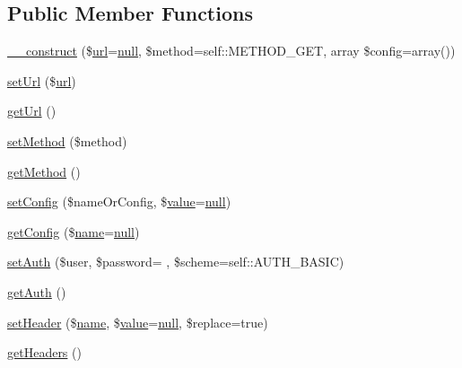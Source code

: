 \subsection*{Public Member Functions}
\begin{DoxyCompactItemize}
\item 
\hyperlink{classHTTP__Request2_a8dbfb11ace471827bd83792df59ded9f}{\+\_\+\+\_\+construct} (\$\hyperlink{swfupload_8js_a440a52a9004fdab0700100a6ddb49f67}{url}=\hyperlink{modernizr_8min_8js_a286f9ec831c5e676eeb493248eab9575}{null}, \$method=self\+::\+M\+E\+T\+H\+O\+D\+\_\+\+G\+ET, array \$config=array())
\item 
\hyperlink{classHTTP__Request2_a323cb019d1cb621ec9419941d42130d1}{set\+Url} (\$\hyperlink{swfupload_8js_a440a52a9004fdab0700100a6ddb49f67}{url})
\item 
\hyperlink{classHTTP__Request2_a35d9ef6e266d90ad52a5037b70850694}{get\+Url} ()
\item 
\hyperlink{classHTTP__Request2_a3372c369ddc092061cc15ff2f80a859f}{set\+Method} (\$method)
\item 
\hyperlink{classHTTP__Request2_a1a362b64dbeeb0321b55df04c6f2c820}{get\+Method} ()
\item 
\hyperlink{classHTTP__Request2_a57145f6158a2af444b1f7b3f38bcd0c9}{set\+Config} (\$name\+Or\+Config, \$\hyperlink{common_2js_2jquery_8js_abe5393d870043cf6aaa1d5ad5fce755c}{value}=\hyperlink{modernizr_8min_8js_a286f9ec831c5e676eeb493248eab9575}{null})
\item 
\hyperlink{classHTTP__Request2_a420485bbf5cc4a95399fe01138fe6ce6}{get\+Config} (\$\hyperlink{common_8js_a22c29d2aa8ed6161ce8faa718ef76e68}{name}=\hyperlink{modernizr_8min_8js_a286f9ec831c5e676eeb493248eab9575}{null})
\item 
\hyperlink{classHTTP__Request2_a3ed0781251e632a15aadaaff960ec854}{set\+Auth} (\$user, \$password= \textquotesingle{}\textquotesingle{}, \$scheme=self\+::\+A\+U\+T\+H\+\_\+\+B\+A\+S\+IC)
\item 
\hyperlink{classHTTP__Request2_a92573cc9573e255bd2a9fe476153898f}{get\+Auth} ()
\item 
\hyperlink{classHTTP__Request2_adbdceb126835d75826cc461c27d27b14}{set\+Header} (\$\hyperlink{common_8js_a22c29d2aa8ed6161ce8faa718ef76e68}{name}, \$\hyperlink{common_2js_2jquery_8js_abe5393d870043cf6aaa1d5ad5fce755c}{value}=\hyperlink{modernizr_8min_8js_a286f9ec831c5e676eeb493248eab9575}{null}, \$replace=true)
\item 
\hyperlink{classHTTP__Request2_a49ae39a8a6531b205b15496e42b994cf}{get\+Headers} ()

\end{DoxyCompactItemize}
